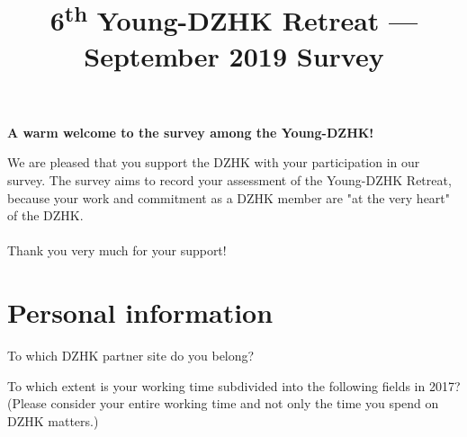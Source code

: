 \documentclass[
  english,
  globalid=09-2019-v4-Young-DZHK,
  print_questionnaire_id,
  pagemark,
  stamp]{sdaps}
\title{6\textsuperscript{th} Young-DZHK Retreat --- September 2019 Survey}
\begin{document}

  \begin{questionnaire}
    \begin{info}
\textbf{A warm welcome to the survey among the Young-DZHK!}

We are pleased that you support the DZHK with your participation in our survey.
The survey aims to record your assessment of the Young-DZHK Retreat, because your work
and commitment as a DZHK member are "at the very heart" of the DZHK.
\\
\\
Thank you very much for your support!

   \end{info}


    \section{Personal information}

    
        \begin{choicequestion}[2]{To which DZHK partner site do you belong?}
      
    \end{choicequestion}
 
    \begin{markgroup}{To which extent is your working time subdivided into the 
following fields in 2017? (Please consider your entire
working time and not only the time you spend on DZHK matters.)}


\end{markgroup}
\end{questionnaire}
\end{document}
